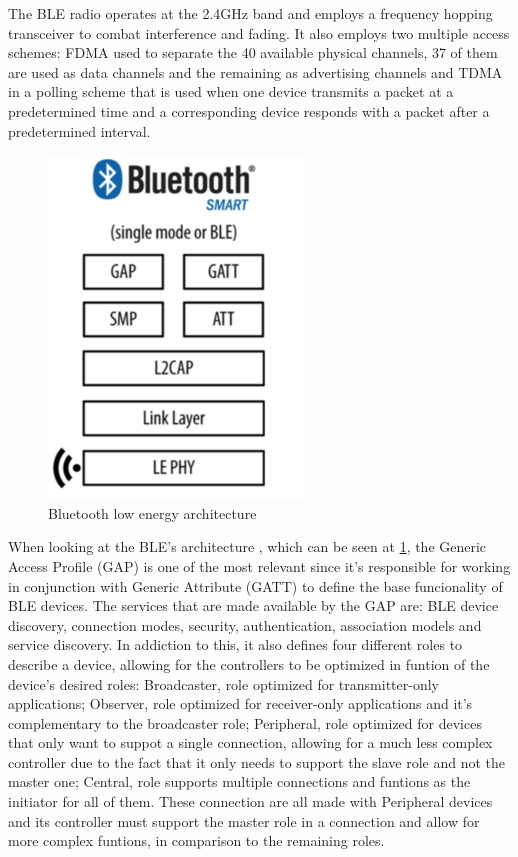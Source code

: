 \documentclass[a4paper]{IEEEtran}
\begin{document}
The BLE radio operates at the 2.4GHz band and employs a frequency hopping transceiver to combat interference and fading. It also employs two multiple access schemes: FDMA used to separate the 40 available physical channels, 37 of them are used as data channels and the remaining as advertising channels and TDMA in a polling scheme that is used when one device transmits a packet at a predetermined time and a corresponding device responds with a packet after a predetermined interval.

 \begin{figure}[htp]
	\centering
		\includegraphics[width=0.5\linewidth]{figures/BLEArchitecture.png}
	\caption[Bluetooth Low Energy Architecture]{Bluetooth low energy architecture}
	\label{fig:BLEarchitecture}
\end{figure}

When looking at the BLE's architecture , which can be seen at \ref{fig:BLEarchitecture}, the Generic Access Profile (GAP) is one of the most relevant since it's responsible for working in conjunction with Generic Attribute (GATT) to define the base funcionality of BLE devices. The services that are made available by the GAP are: BLE device discovery, connection modes, security, authentication, association models and service discovery.
In addiction to this, it also defines four different roles to describe a device, allowing for the controllers to be optimized in funtion of the device's desired roles: 
Broadcaster, role optimized for transmitter-only applications; 
Observer, role optimized for receiver-only applications and it's complementary to the broadcaster role;
Peripheral, role optimized for devices that only want to suppot a single connection, allowing for a much less complex controller due to the fact that it only needs to support the slave role and not the master one; 
Central, role supports multiple connections and funtions as the initiator for all of them. These connection are all made with Peripheral devices and its controller must support the master role in a connection and allow for more complex funtions, in comparison to the remaining roles.
\end{document}
